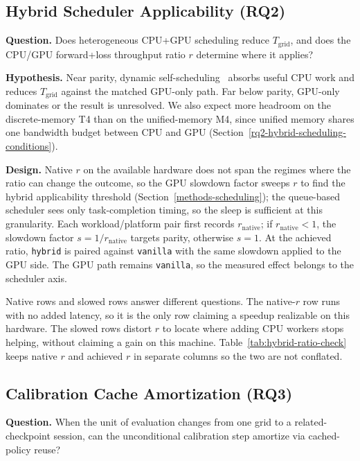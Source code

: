 \subsection{Hybrid Scheduler Applicability
(RQ2)}\label{experiment-2-hybrid}

\textbf{Question.} Does heterogeneous CPU+GPU scheduling
reduce $T_{\text{grid}}$, and does the CPU/GPU forward+loss
throughput ratio $r$ determine where it applies?

\textbf{Hypothesis.} Near parity, dynamic self-scheduling~\cite{kruskal1985selfscheduling}
absorbs useful CPU work and reduces $T_{\text{grid}}$
against the matched GPU-only path. Far below parity,
GPU-only dominates or the result is unresolved. We also 
expect more headroom on the discrete-memory T4 than on the
unified-memory M4, since unified memory shares one bandwidth
budget between CPU and GPU
(Section~\ref{rq2-hybrid-scheduling-conditions}).

\textbf{Design.} Native $r$ on the available hardware does
not span the regimes where the ratio can change the outcome, so
the GPU slowdown factor sweeps $r$ to find the hybrid applicability threshold (Section~\ref{methods-scheduling}); the queue-based
scheduler sees only task-completion timing, so the sleep is
sufficient at this granularity. Each workload/platform pair
first records $r_{\text{native}}$; if $r_{\text{native}}<1$,
the slowdown factor $s=1/r_{\text{native}}$ targets parity,
otherwise $s=1$. At the achieved ratio, \texttt{hybrid} is
paired against \texttt{vanilla} with the same slowdown
applied to the GPU side. The GPU path remains
\texttt{vanilla}, so the measured effect belongs to the
scheduler axis.

Native rows and slowed rows answer different questions. The
native-$r$ row runs with no added latency, so it is the only
row claiming a speedup realizable on this hardware. The slowed
rows distort $r$ to locate where adding CPU workers stops
helping, without claiming a gain on
this machine. Table~\ref{tab:hybrid-ratio-check} keeps native
$r$ and achieved $r$ in separate columns so the two are not
conflated.

\subsection{Calibration Cache Amortization
(RQ3)}\label{experiment-3-cache}

\textbf{Question.} When the unit of evaluation changes from
one grid to a related-checkpoint session, can the
unconditional calibration step amortize via 
cached-policy reuse?

